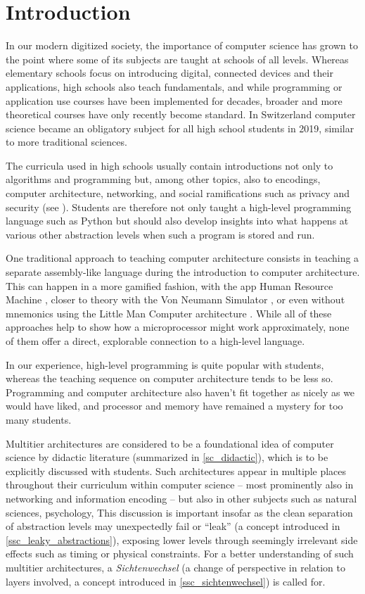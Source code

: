 
\chapter{Introduction}

In our modern digitized society, the importance of computer science has grown to the point where some of its subjects are taught at schools of all levels. Whereas elementary schools focus on introducing digital, connected devices and their applications, high schools also teach fundamentals, and while programming or application use courses have been implemented for decades, broader and more theoretical courses have only recently become standard. In Switzerland \eg computer science became an obligatory subject for all high school students in 2019, similar to more traditional sciences.

The curricula used in high schools usually contain introductions not only to algorithms and programming but, among other topics, also to encodings, computer architecture, networking, and social ramifications such as privacy and security (see \eg \cite{Erz16}). Students are therefore not only taught a high-level programming language such as Python but should also develop insights into what happens at various other abstraction levels when such a program is stored and run.

One traditional approach to teaching computer architecture consists in teaching a separate assembly-like language during the introduction to computer architecture. This can happen in a more gamified fashion, \eg with the app Human Resource Machine \cite{Tom15}, closer to theory with the Von Neumann Simulator \cite{Gan23}, or even without mnemonics using the Little Man Computer architecture \cite{Oin25}. While all of these approaches help to show how a microprocessor might work approximately, none of them offer a direct, explorable connection to a high-level language.

In our experience, high-level programming is quite popular with students, whereas the teaching sequence on computer architecture tends to be less so. Programming and computer architecture also haven't fit together as nicely as we would have liked, and processor and memory have remained a mystery for too many students.

Multitier architectures are considered to be a foundational idea of computer science by didactic literature (summarized in \ref{sc_didactic}), which is to be explicitly discussed with students. Such architectures appear in multiple places throughout their curriculum within computer science -- most prominently also in networking and information encoding -- but also in other subjects such as natural sciences, psychology, \etc This discussion is important insofar as the clean separation of abstraction levels may unexpectedly fail or ``leak'' (a concept introduced in \ref{ssc_leaky_abstractions}), exposing lower levels through seemingly irrelevant side effects such as timing or physical constraints. For a better understanding of such multitier architectures, a \emph{Sichtenwechsel} (\ie a change of perspective in relation to layers involved, a concept introduced in \ref{ssc_sichtenwechsel}) is called for.

